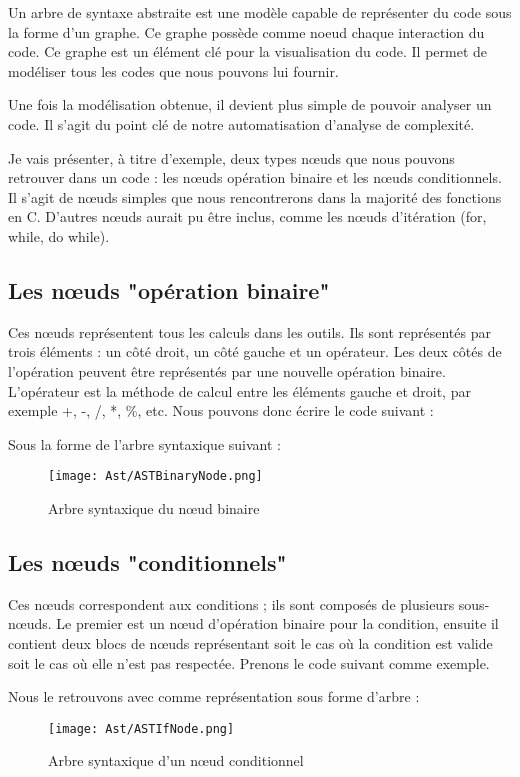 \documentclass[12pt, twoside, openright]{report}
\begin{document}
Un arbre de syntaxe abstraite est une modèle capable de représenter du code sous la forme d'un graphe. Ce graphe possède comme noeud chaque interaction du code. Ce graphe est un élément clé pour la visualisation du code. Il permet de modéliser tous les codes que nous pouvons lui fournir. 

Une fois la modélisation obtenue, il devient plus simple de pouvoir analyser un code. Il s'agit du point clé de notre automatisation d'analyse de complexité.  

Je vais présenter, à titre d'exemple, deux types n\oe{}uds que nous pouvons retrouver dans un code : les n\oe{}uds opération binaire et les n\oe{}uds conditionnels. Il s'agit de n\oe{}uds simples que nous rencontrerons dans la majorité des fonctions en C. D'autres n\oe{}uds aurait pu être inclus, comme les n\oe{}uds d'itération (for, while, do while).

\subsection{Les n\oe{}uds "opération binaire"}

Ces n\oe{}uds représentent tous les calculs dans les outils. Ils sont représentés par trois éléments : un côté droit, un côté gauche et un opérateur. Les deux côtés de l'opération peuvent être représentés par une nouvelle opération binaire. L'opérateur est la méthode de calcul entre les éléments gauche et droit, par exemple +, -, /, *, \%, etc. Nous pouvons donc écrire le code suivant :


Sous la forme de l'arbre syntaxique suivant : 
\begin{center}
    \begin{figure}[H]
        \texttt{[image: Ast/ASTBinaryNode.png]}
        \caption{Arbre syntaxique du n\oe{}ud binaire}
    \end{figure}
\end{center}

\subsection{Les n\oe{}uds "conditionnels"}
Ces n\oe{}uds correspondent aux conditions ; ils sont composés de plusieurs sous-n\oe{}uds. Le premier est un n\oe{}ud d'opération binaire pour la condition, ensuite il contient deux blocs de n\oe{}uds représentant soit le cas où la condition est valide soit le cas où elle n'est pas respectée. Prenons le code suivant comme exemple.
    
    Nous le retrouvons avec comme représentation sous forme d'arbre :
    \begin{figure}[H]
        \begin{center}
            \texttt{[image: Ast/ASTIfNode.png]}
            \caption{Arbre syntaxique d'un n\oe{}ud conditionnel}
        \end{center}
    \end{figure}
\end{document}
